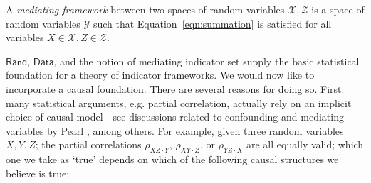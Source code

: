 \documentclass[sigconf]{acmart}
\newcommand{\redout}[1]{{\color{red}#1}}
\newcommand{\Cat}[1]{\mathsf{#1}}
\def\Rand{\Cat{Rand}}
\def\Data{\Cat{Data}}
\begin{document}
\begin{definition}
A \emph{mediating framework} between two spaces of random variables $\mathcal{X}, \mathcal{Z}$ is a space of random variables $\mathcal{Y}$ such that Equation~\ref{eqn:summation} is satisfied for all variables $X \in \mathcal{X}, Z \in \mathcal{Z}$. %
\end{definition}



$\Rand$, $\Data$, and the notion of mediating indicator set supply the basic statistical foundation for a theory of indicator frameworks. We would now like to incorporate a causal foundation. There are several reasons for doing so. First: many statistical arguments, e.g. partial correlation, actually rely on an implicit choice of causal model---see discussions related to confounding and mediating variables by Pearl \cite{pearl09}, among others. For example, given three random variables $X, Y, Z$; the partial correlations $\rho_{XZ \cdot Y}$, $\rho_{XY \cdot Z}$, or $\rho_{YZ \cdot X}$ are all equally valid; which one we take as `true' depends on which of the following causal structures we believe is true:
\end{document}
